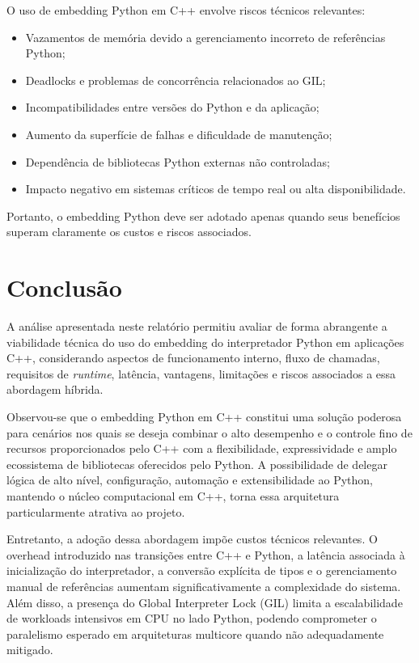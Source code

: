 O uso de embedding Python em C++ envolve riscos técnicos relevantes:

\begin{itemize}
    \item Vazamentos de memória devido a gerenciamento incorreto de referências Python;
    \item Deadlocks e problemas de concorrência relacionados ao GIL;
    \item Incompatibilidades entre versões do Python e da aplicação;
    \item Aumento da superfície de falhas e dificuldade de manutenção;
    \item Dependência de bibliotecas Python externas não controladas;
    \item Impacto negativo em sistemas críticos de tempo real ou alta disponibilidade.
\end{itemize}

Portanto, o embedding Python deve ser adotado apenas quando seus benefícios superam claramente os custos e riscos associados.

\section{Conclusão}

A análise apresentada neste relatório permitiu avaliar de forma abrangente a viabilidade técnica do uso do embedding do interpretador Python em aplicações C++, considerando aspectos de funcionamento interno, fluxo de chamadas, requisitos de \emph{runtime}, latência, vantagens, limitações e riscos associados a essa abordagem híbrida.

Observou-se que o embedding Python em C++ constitui uma solução poderosa para cenários nos quais se deseja combinar o alto desempenho e o controle fino de recursos proporcionados pelo C++ com a flexibilidade, expressividade e amplo ecossistema de bibliotecas oferecidos pelo Python. A possibilidade de delegar lógica de alto nível, configuração, automação e extensibilidade ao Python, mantendo o núcleo computacional em C++, torna essa arquitetura particularmente atrativa ao projeto.

Entretanto, a adoção dessa abordagem impõe custos técnicos relevantes. O overhead introduzido nas transições entre C++ e Python, a latência associada à inicialização do interpretador, a conversão explícita de tipos e o gerenciamento manual de referências aumentam significativamente a complexidade do sistema. Além disso, a presença do Global Interpreter Lock (GIL) limita a escalabilidade de workloads intensivos em CPU no lado Python, podendo comprometer o paralelismo esperado em arquiteturas multicore quando não adequadamente mitigado.

